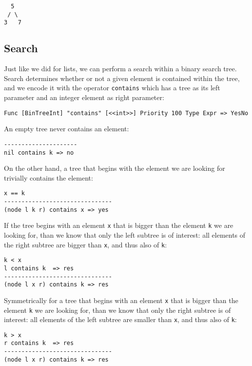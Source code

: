 \begin{lstlisting}
  5
 / \
3   7
\end{lstlisting}


\subsection{Search}
Just like we did for lists, we can perform a search within a binary search tree. Search determines whether or not a given element is contained within the tree, and we encode it with the operator \texttt{contains} which has a tree as its left parameter and an integer element as right parameter:

\begin{lstlisting}
Func [BinTreeInt] "contains" [<<int>>] Priority 100 Type Expr => YesNo
\end{lstlisting}

An empty tree never contains an element:

\begin{lstlisting}
---------------------
nil contains k => no
\end{lstlisting}

On the other hand, a tree that begins with the element we are looking for trivially contains the element:

\begin{lstlisting}
x == k
-------------------------------
(node l k r) contains x => yes
\end{lstlisting}

If the tree begins with an element \texttt{x} that is bigger than the element \texttt{k} we are looking for, than we know that only the left subtree is of interest: all elements of the right subtree are bigger than \texttt{x}, and thus also of \texttt{k}:

\begin{lstlisting}
k < x
l contains k  => res
-------------------------------
(node l x r) contains k => res
\end{lstlisting}

Symmetrically for a tree that begins with an element \texttt{x} that is bigger than the element \texttt{k} we are looking for, than we know that only the right subtree is of interest: all elements of the left subtree are smaller than \texttt{x}, and thus also of \texttt{k}:

\begin{lstlisting}
k > x
r contains k  => res
-------------------------------
(node l x r) contains k => res
\end{lstlisting}


